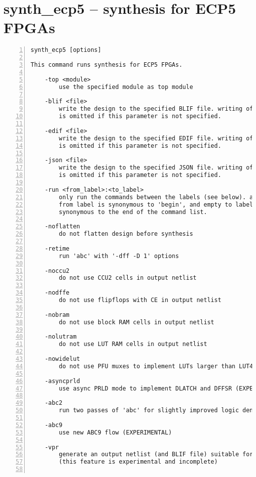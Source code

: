 \section{synth\_ecp5 -- synthesis for ECP5 FPGAs}
\label{cmd:synth_ecp5}
\begin{lstlisting}[numbers=left,frame=single]
    synth_ecp5 [options]

This command runs synthesis for ECP5 FPGAs.

    -top <module>
        use the specified module as top module

    -blif <file>
        write the design to the specified BLIF file. writing of an output file
        is omitted if this parameter is not specified.

    -edif <file>
        write the design to the specified EDIF file. writing of an output file
        is omitted if this parameter is not specified.

    -json <file>
        write the design to the specified JSON file. writing of an output file
        is omitted if this parameter is not specified.

    -run <from_label>:<to_label>
        only run the commands between the labels (see below). an empty
        from label is synonymous to 'begin', and empty to label is
        synonymous to the end of the command list.

    -noflatten
        do not flatten design before synthesis

    -retime
        run 'abc' with '-dff -D 1' options

    -noccu2
        do not use CCU2 cells in output netlist

    -nodffe
        do not use flipflops with CE in output netlist

    -nobram
        do not use block RAM cells in output netlist

    -nolutram
        do not use LUT RAM cells in output netlist

    -nowidelut
        do not use PFU muxes to implement LUTs larger than LUT4s

    -asyncprld
        use async PRLD mode to implement DLATCH and DFFSR (EXPERIMENTAL)

    -abc2
        run two passes of 'abc' for slightly improved logic density

    -abc9
        use new ABC9 flow (EXPERIMENTAL)

    -vpr
        generate an output netlist (and BLIF file) suitable for VPR
        (this feature is experimental and incomplete)


\end{lstlisting}
